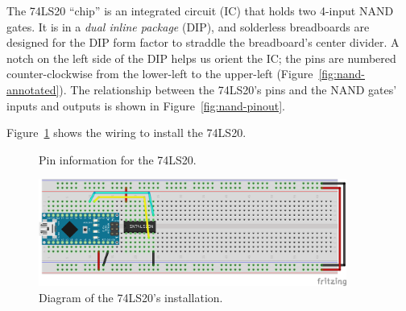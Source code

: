The 74LS20 ``chip'' is an integrated circuit (IC) that holds two 4-input NAND gates.
It is in a \textit{dual inline package} (DIP), and solderless breadboards are designed for the DIP form factor to straddle the breadboard's center divider.
A notch on the left side of the DIP helps us orient the IC; the pins are numbered counter-clockwise from the lower-left to the upper-left (Figure~\ref{fig:nand-annotated}).
The relationship between the 74LS20's pins and the NAND gates' inputs and outputs is shown in Figure~\ref{fig:nand-pinout}.

Figure~\ref{fig:nand-diagram} shows the wiring to install the 74LS20.

\begin{figure}
    \centering
    \hfil
    \caption{Pin information for the 74LS20.}
\end{figure}

\begin{figure}
    \centering
    \includegraphics[width=0.9\textwidth]{fritzing_diagrams/nand}
    \caption{Diagram of the 74LS20's installation. \label{fig:nand-diagram}}
\end{figure}

